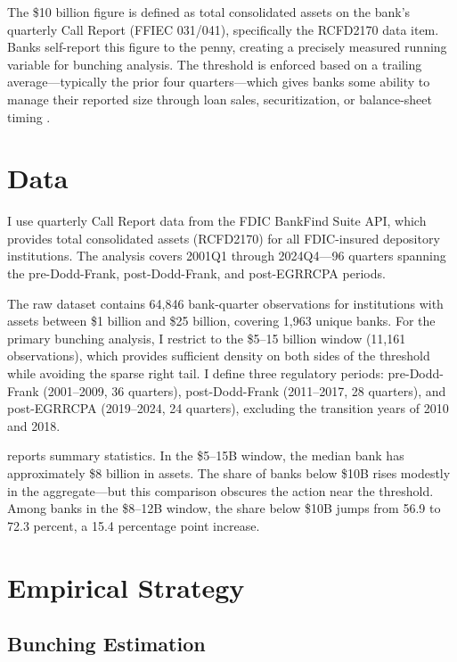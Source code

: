 \documentclass[12pt]{article}
\begin{document}
The \$10 billion figure is defined as total consolidated assets on the bank's quarterly Call Report (FFIEC 031/041), specifically the RCFD2170 data item. Banks self-report this figure to the penny, creating a precisely measured running variable for bunching analysis. The threshold is enforced based on a trailing average---typically the prior four quarters---which gives banks some ability to manage their reported size through loan sales, securitization, or balance-sheet timing \citep{Bouwman2018}.

\section{Data}
\label{sec:data}

I use quarterly Call Report data from the FDIC BankFind Suite API, which provides total consolidated assets (RCFD2170) for all FDIC-insured depository institutions. The analysis covers 2001Q1 through 2024Q4---96 quarters spanning the pre-Dodd-Frank, post-Dodd-Frank, and post-EGRRCPA periods.

The raw dataset contains 64,846 bank-quarter observations for institutions with assets between \$1 billion and \$25 billion, covering 1,963 unique banks. For the primary bunching analysis, I restrict to the \$5--15 billion window (11,161 observations), which provides sufficient density on both sides of the threshold while avoiding the sparse right tail. I define three regulatory periods: pre-Dodd-Frank (2001--2009, 36 quarters), post-Dodd-Frank (2011--2017, 28 quarters), and post-EGRRCPA (2019--2024, 24 quarters), excluding the transition years of 2010 and 2018.

 reports summary statistics. In the \$5--15B window, the median bank has approximately \$8 billion in assets. The share of banks below \$10B rises modestly in the aggregate---but this comparison obscures the action near the threshold. Among banks in the \$8--12B window, the share below \$10B jumps from 56.9 to 72.3 percent, a 15.4 percentage point increase.



\section{Empirical Strategy}
\label{sec:strategy}

\subsection{Bunching Estimation}
\end{document}
